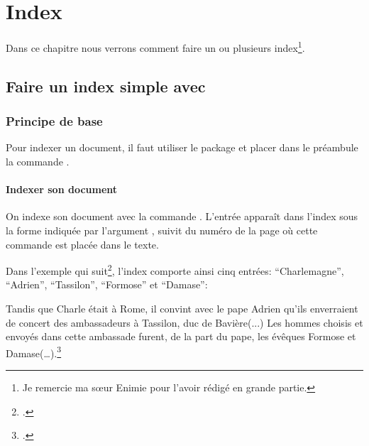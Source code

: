 \chapter{Index}

\begin{prealable}

Dans ce chapitre nous verrons comment faire un ou plusieurs index\footnote{Je remercie ma sœur Enimie pour l'avoir rédigé en grande partie.}.

\end{prealable}


\section{Faire un index simple avec }


\subsection{Principe de base}


Pour indexer un document, il faut utiliser le package  et placer  dans le préambule la commande .

\begin{latexcode}
\usepackage{makeidx}
\makeindex
\end{latexcode}

\subsubsection{Indexer son document}



On indexe son document avec  la commande \label{cmdindex}. L'entrée apparaît dans l'index sous la forme indiquée par l'argument , suivit du numéro de la page où cette commande est placée dans le texte. 

Dans l'exemple qui suit\footcite{eginhard}, l'index comporte ainsi cinq entrées: \enquote{Charlemagne}, \enquote{Adrien}, \enquote{Tassilon}, \enquote{Formose} et \enquote{Damase}:

\begin{latexcode}

Tandis que Charle était à Rome, il convint
avec le pape Adrien qu’ils enverraient de concert
des ambassadeurs à Tassilon, duc de Bavière(...)
Les hommes choisis et envoyés dans cette ambassade furent, de 
la part du pape, les évêques Formose et 
Damase(…).\footcite{eginhard}

\end{latexcode}



